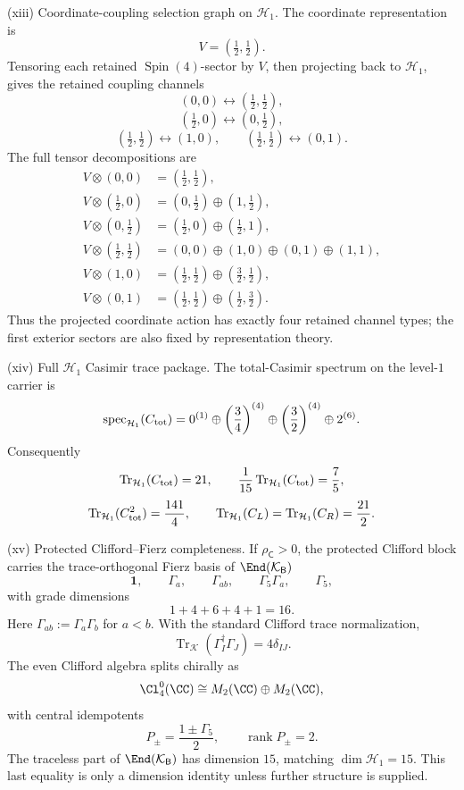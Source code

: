 \documentclass[11pt]{article}
\begin{document}
\begin{theorem}
\smallskip
\noindent\textup{(xiii) Coordinate-coupling selection graph on \(\mathcal H_1\).}
The coordinate representation is
\[
    V=(\tfrac12,\tfrac12).
\]
Tensoring each retained \(\operatorname{Spin}(4)\)-sector by \(V\), then projecting back to
\(\mathcal H_1\), gives the retained coupling channels
\[
    (0,0)\leftrightarrow(\tfrac12,\tfrac12),
\]
\[
    (\tfrac12,0)\leftrightarrow(0,\tfrac12),
\]
\[
    (\tfrac12,\tfrac12)\leftrightarrow(1,0),
    \qquad
    (\tfrac12,\tfrac12)\leftrightarrow(0,1).
\]
The full tensor decompositions are
\[
\begin{aligned}
V\otimes(0,0)&=(\tfrac12,\tfrac12),\\
V\otimes(\tfrac12,0)&=(0,\tfrac12)\oplus(1,\tfrac12),\\
V\otimes(0,\tfrac12)&=(\tfrac12,0)\oplus(\tfrac12,1),\\
V\otimes(\tfrac12,\tfrac12)&=(0,0)\oplus(1,0)\oplus(0,1)\oplus(1,1),\\
V\otimes(1,0)&=(\tfrac12,\tfrac12)\oplus(\tfrac32,\tfrac12),\\
V\otimes(0,1)&=(\tfrac12,\tfrac12)\oplus(\tfrac12,\tfrac32).
\end{aligned}
\]
Thus the projected coordinate action has exactly four retained channel types;
the first exterior sectors are also fixed by representation theory.

\smallskip
\noindent\textup{(xiv) Full \(\mathcal H_1\) Casimir trace package.}
The total-Casimir spectrum on the level-\(1\) carrier is
\[
    \operatorname{spec}_{\mathcal H_1}(C_{\rm tot})
    =0^{(1)}
    \oplus\left(\frac34\right)^{(4)}
    \oplus\left(\frac32\right)^{(4)}
    \oplus2^{(6)}.
\]
Consequently
\[
    \operatorname{Tr}_{\mathcal H_1}(C_{\rm tot})=21,
    \qquad
    \frac1{15}\operatorname{Tr}_{\mathcal H_1}(C_{\rm tot})=\frac75,
\]
\[
    \operatorname{Tr}_{\mathcal H_1}(C_{\rm tot}^2)=\frac{141}{4},
    \qquad
    \operatorname{Tr}_{\mathcal H_1}(C_L)
    =\operatorname{Tr}_{\mathcal H_1}(C_R)=\frac{21}{2}.
\]

\smallskip
\noindent\textup{(xv) Protected Clifford--Fierz completeness.}
If \(\rho_{\mathsf C}>0\), the protected Clifford block carries the
trace-orthogonal Fierz basis of
\(\End(\mathcal K_{\mathsf B})\)
\[
    \mathbf1,
    \qquad
    \Gamma_a,
    \qquad
    \Gamma_{ab},
    \qquad
    \Gamma_5\Gamma_a,
    \qquad
    \Gamma_5,
\]
with grade dimensions
\[
    1+4+6+4+1=16.
\]
Here \(\Gamma_{ab}:=\Gamma_a\Gamma_b\) for \(a<b\). With the standard Clifford trace normalization,
\[
    \operatorname{Tr}_{\mathcal K}(\Gamma_I^\dagger\Gamma_J)=4\delta_{IJ}.
\]
The even Clifford algebra splits chirally as
\[
    \Cl^0_4(\CC)\cong M_2(\CC)\oplus M_2(\CC),
\]
with central idempotents
\[
    P_\pm=\frac{1\pm\Gamma_5}{2},
    \qquad
    \operatorname{rank}P_\pm=2.
\]
The traceless part of \(\End(\mathcal K_{\mathsf B})\) has dimension \(15\),
matching \(\dim\mathcal H_1=15\).  This last equality is only a dimension
identity unless further structure is supplied.
\end{theorem}
\end{document}
